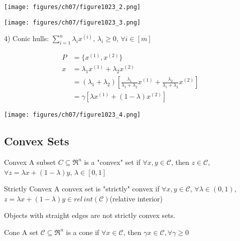 \begin{marginfigure}
	\centering
	\texttt{[image: figures/ch07/figure1023\_2.png]}
\end{marginfigure}

\begin{marginfigure}
	\centering
	\texttt{[image: figures/ch07/figure1023\_3.png]}
\end{marginfigure}

4) Conic hulls: $\sum^n_{i=1}\lambda_i x^{(i)}$, $\lambda_i \geq 0$, $\forall i\in [m]$

\begin{align*}
P &= \{x^{(1)}, x^{(2)} \}\\
x &= \lambda_1x^{(1)} + \lambda_2x^{(2)}\\
&= ( \lambda_1 + \lambda_2)[\frac{\lambda_1}{\lambda_1 + \lambda_2}x^{(1)} + \frac{\lambda_2}{\lambda_1 + \lambda_2}x^{(2)}]\\
&= \gamma[\lambda x^{(1)} + (1-\lambda)x^{(2)}]
\end{align*}

\begin{marginfigure}
	\centering
	\texttt{[image: figures/ch07/figure1023\_4.png]}
\end{marginfigure}

\subsection{Convex Sets}

\begin{definition}{Convex}
	A subset $C\subseteq \Re^n$ is a "convex" set if $\forall x,y \in \mathcal{C}$, then $z\in \mathcal{C}$, $\forall z = \lambda x + (1-\lambda)y$, $\lambda \in [0,1]$
\end{definition}


\begin{definition}{Strictly Convex}
	A convex set is "strictly" convex if $\forall x,y \in \mathcal{C}$, $\forall \lambda \in (0,1)$, $z = \lambda x + (1-\lambda)y \in rel\,int(\mathcal{C})$(relative interior)
\end{definition}

Objects with straight edges are not strictly convex sets.

\begin{definition}{Cone}
	A set $\mathcal{C}\subseteq \Re^n $ is a cone if $\forall x\in \mathcal{C}$, then $\gamma x\in \mathcal{C}, \forall \gamma \geq 0$
\end{definition}

